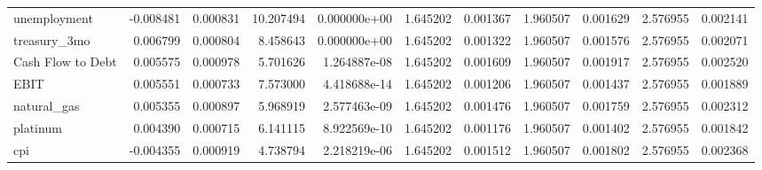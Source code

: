 \documentclass[12pt,a4paper,english]{article}
\begin{document}
{{\begin{tabular}{@{}lrrrrrrrrrr@{}}
			unemployment                   & -0.008481                & 0.000831                    & 10.207494                 & 0.000000e+00                             & 1.645202                      & 0.001367                      & 1.960507                     & 0.001629                     & 2.576955                     & 0.002141                     \\
			treasury\_3mo                  & 0.006799                 & 0.000804                    & 8.458643                  & 0.000000e+00                             & 1.645202                      & 0.001322                      & 1.960507                     & 0.001576                     & 2.576955                     & 0.002071                     \\
			Cash Flow to Debt              & 0.005575                 & 0.000978                    & 5.701626                  & 1.264887e-08                             & 1.645202                      & 0.001609                      & 1.960507                     & 0.001917                     & 2.576955                     & 0.002520                     \\
			EBIT                           & 0.005551                 & 0.000733                    & 7.573000                  & 4.418688e-14                             & 1.645202                      & 0.001206                      & 1.960507                     & 0.001437                     & 2.576955                     & 0.001889                     \\
			natural\_gas                   & 0.005355                 & 0.000897                    & 5.968919                  & 2.577463e-09                             & 1.645202                      & 0.001476                      & 1.960507                     & 0.001759                     & 2.576955                     & 0.002312                     \\
			platinum                       & 0.004390                 & 0.000715                    & 6.141115                  & 8.922569e-10                             & 1.645202                      & 0.001176                      & 1.960507                     & 0.001402                     & 2.576955                     & 0.001842                     \\
			cpi                            & -0.004355                & 0.000919                    & 4.738794                  & 2.218219e-06                             & 1.645202                      & 0.001512                      & 1.960507                     & 0.001802                     & 2.576955                     & 0.002368                     \\

\end{tabular}}}
\end{document}
